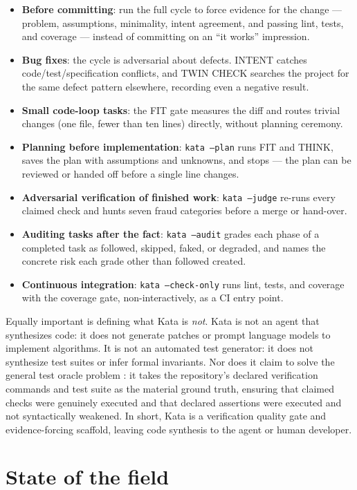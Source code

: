 \documentclass[11pt]{article}
\begin{document}
\begin{itemize}
\item \textbf{Before committing}: run the full cycle to force evidence for
the change --- problem, assumptions, minimality, intent agreement, and
passing lint, tests, and coverage --- instead of committing on an ``it works''
impression.
\item \textbf{Bug fixes}: the cycle is adversarial about defects. INTENT
catches code/test/specification conflicts, and TWIN CHECK searches the
project for the same defect pattern elsewhere, recording even a negative
result.
\item \textbf{Small code-loop tasks}: the FIT gate measures the diff and
routes trivial changes (one file, fewer than ten lines) directly, without
planning ceremony.
\item \textbf{Planning before implementation}: \texttt{kata --plan} runs FIT
and THINK, saves the plan with assumptions and unknowns, and stops --- the
plan can be reviewed or handed off before a single line changes.
\item \textbf{Adversarial verification of finished work}:
\texttt{kata --judge} re-runs every claimed check and hunts seven fraud
categories before a merge or hand-over.
\item \textbf{Auditing tasks after the fact}: \texttt{kata --audit} grades
each phase of a completed task as followed, skipped, faked, or degraded, and
names the concrete risk each grade other than followed created.
\item \textbf{Continuous integration}: \texttt{kata --check-only} runs lint,
tests, and coverage with the coverage gate, non-interactively, as a CI entry
point.
\end{itemize}

Equally important is defining what Kata is \emph{not}. Kata is not an agent
that synthesizes code: it does not generate patches or prompt language
models to implement algorithms. It is not an automated test generator: it
does not synthesize test suites or infer formal invariants. Nor does it
claim to solve the general test oracle problem \cite{barr-oracle}: it takes
the repository's declared verification commands and test suite as the
material ground truth, ensuring that claimed checks were genuinely executed
and that declared assertions were executed and not syntactically weakened. In short, Kata is a
verification quality gate and evidence-forcing scaffold, leaving code
synthesis to the agent or human developer.

\section{State of the field}
\label{sec:field}
\end{document}
